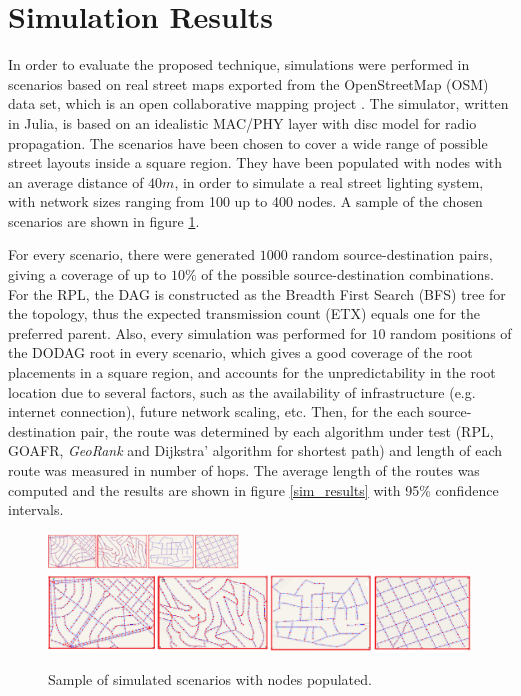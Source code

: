 \documentclass[final,authoryear,3p,twocolumn]{elsarticle}
\begin{document}
\section{Simulation Results}
\label{secSimulation}

In order to evaluate the proposed technique, simulations were performed in scenarios based on real street maps exported from the OpenStreetMap (OSM) data set, which is an open collaborative mapping project \citep{OSM}. The simulator, written in Julia, is based on an idealistic MAC/PHY layer with disc model for radio propagation. The scenarios have been chosen to cover a wide range of possible street layouts inside a square region. They have been populated with nodes with an average distance of $40m$, in order to simulate a real street lighting system, with network sizes ranging from 100 up to 400 nodes. A sample of the chosen scenarios are shown in figure \ref{sim_scenarios}. 

For every scenario, there were generated $1000$ random source-destination pairs, giving a coverage of up to $10$\% of the possible source-destination combinations. For the RPL, the DAG is constructed as the Breadth First Search (BFS) tree for the topology, thus the expected transmission count (ETX) equals one for the preferred parent. Also, every simulation was performed for $10$ random positions of the DODAG root in every scenario, which gives a good coverage of the root placements in a square region, and accounts for the unpredictability in the root location due to several factors, such as the availability of infrastructure (e.g. internet connection),  future network scaling, etc. Then, for the each source-destination pair, the route was determined by each algorithm under test (RPL, GOAFR, \textit{GeoRank} and Dijkstra' algorithm for shortest path) and length of each route was measured in number of hops. The average length of the routes was computed and the results are shown in figure \ref{sim_results} with 95\% confidence intervals. 
  
\begin{figure}
\centering
\ifdefined\TWOCOL
\includegraphics[width=0.45\textwidth]{figures/sample_scenarios.eps}
\else
\includegraphics[width=1\textwidth]{sample_scenarios.eps}
\fi
\caption{Sample of simulated scenarios with nodes populated.}
\label{sim_scenarios}
\end{figure}
\end{document}
